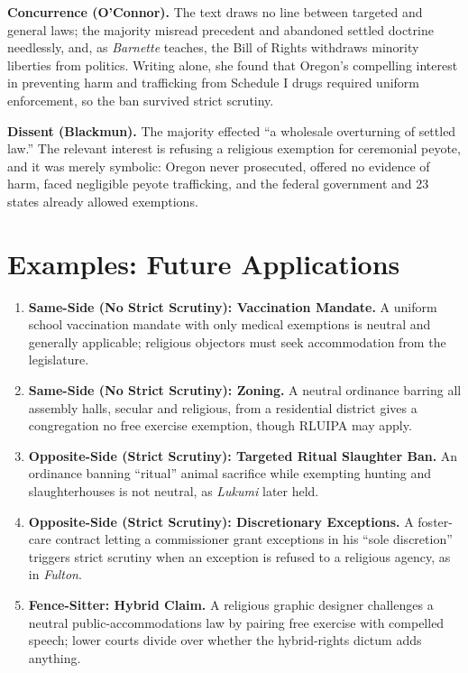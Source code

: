 \documentclass[12pt]{article}
\begin{document}
\textbf{Concurrence (O'Connor).} The text draws no line between targeted and general laws; the majority misread precedent and abandoned settled doctrine needlessly, and, as \textit{Barnette} teaches, the Bill of Rights withdraws minority liberties from politics. Writing alone, she found that Oregon's compelling interest in preventing harm and trafficking from Schedule I drugs required uniform enforcement, so the ban survived strict scrutiny.

\textbf{Dissent (Blackmun).} The majority effected ``a wholesale overturning of settled law.'' The relevant interest is refusing a religious exemption for ceremonial peyote, and it was merely symbolic: Oregon never prosecuted, offered no evidence of harm, faced negligible peyote trafficking, and the federal government and 23 states already allowed exemptions.

\section{Examples: Future Applications}

\begin{enumerate}
\item \textbf{Same-Side (No Strict Scrutiny): Vaccination Mandate.} A uniform school vaccination mandate with only medical exemptions is neutral and generally applicable; religious objectors must seek accommodation from the legislature.
\item \textbf{Same-Side (No Strict Scrutiny): Zoning.} A neutral ordinance barring all assembly halls, secular and religious, from a residential district gives a congregation no free exercise exemption, though RLUIPA may apply.
\item \textbf{Opposite-Side (Strict Scrutiny): Targeted Ritual Slaughter Ban.} An ordinance banning ``ritual'' animal sacrifice while exempting hunting and slaughterhouses is not neutral, as \textit{Lukumi} later held.
\item \textbf{Opposite-Side (Strict Scrutiny): Discretionary Exceptions.} A foster-care contract letting a commissioner grant exceptions in his ``sole discretion'' triggers strict scrutiny when an exception is refused to a religious agency, as in \textit{Fulton}.
\item \textbf{Fence-Sitter: Hybrid Claim.} A religious graphic designer challenges a neutral public-accommodations law by pairing free exercise with compelled speech; lower courts divide over whether the hybrid-rights dictum adds anything.
\end{enumerate}
\end{document}

